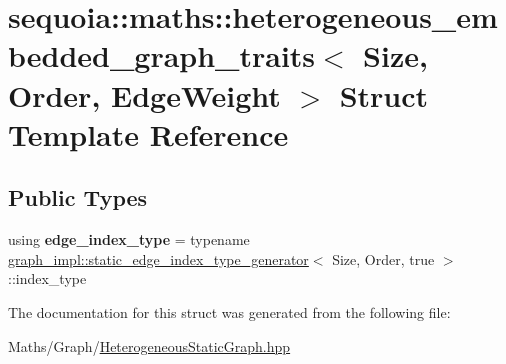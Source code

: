 \hypertarget{structsequoia_1_1maths_1_1heterogeneous__embedded__graph__traits}{}\section{sequoia\+::maths\+::heterogeneous\+\_\+embedded\+\_\+graph\+\_\+traits$<$ Size, Order, Edge\+Weight $>$ Struct Template Reference}
\label{structsequoia_1_1maths_1_1heterogeneous__embedded__graph__traits}
\subsection*{Public Types}
\begin{DoxyCompactItemize}
\item 
\mbox{\label{structsequoia_1_1maths_1_1heterogeneous__embedded__graph__traits_a14f84d164c608fb148ffe59d9f885712}} 
using {\bfseries edge\+\_\+index\+\_\+type} = typename \mbox{\hyperlink{structsequoia_1_1maths_1_1graph__impl_1_1static__edge__index__type__generator}{graph\+\_\+impl\+::static\+\_\+edge\+\_\+index\+\_\+type\+\_\+generator}}$<$ Size, Order, true $>$\+::index\+\_\+type
\end{DoxyCompactItemize}


The documentation for this struct was generated from the following file\+:\begin{DoxyCompactItemize}
\item 
Maths/\+Graph/\mbox{\hyperlink{_heterogeneous_static_graph_8hpp}{Heterogeneous\+Static\+Graph.\+hpp}}\end{DoxyCompactItemize}
